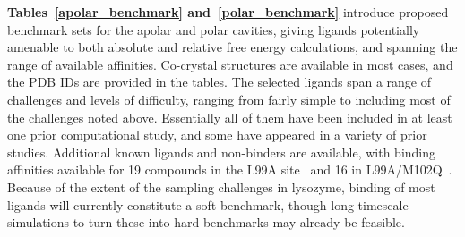 \documentclass[aps,pre,twocolumn,nofootinbib,superscriptaddress,10pt, final,tightenlines]{revtex4-1}
\begin{document}
{\bf Tables~\ref{apolar_benchmark} and~\ref{polar_benchmark}} introduce proposed benchmark sets for the apolar and polar cavities, giving ligands potentially amenable to both absolute and relative free energy calculations, and spanning the range of available affinities. 
Co-crystal structures are available in most cases, and the PDB IDs are provided in the tables. 
The selected ligands span a range of challenges and levels of difficulty, ranging from fairly simple to including most of the challenges noted above. 
Essentially all of them have been included in at least one prior computational study, and some have appeared in a variety of prior studies.
Additional known ligands and non-binders are available, with binding affinities available for 19 compounds in the L99A site~\cite{eriksson_cavity-containing_1992, morton_energetic_1995, mobley_predicting_2007} and 16 in L99A/M102Q~\cite{wei_model_2002, graves_decoys_2005, boyce_predicting_2009}. 
Because of the extent of the sampling challenges in lysozyme, binding of most ligands will currently constitute a soft benchmark, though long-timescale simulations to turn these into hard benchmarks may already be feasible.
\end{document}
